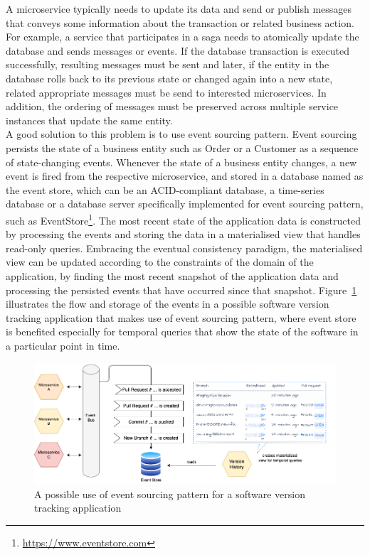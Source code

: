 \documentclass{Configuration_Files/PoliMi3i_thesis}
\begin{document}
A microservice typically needs to update its data and send or publish messages that conveys some information about the transaction or related business action.
For example, a service that participates in a saga needs to atomically update the database and sends messages or events.
If the database transaction is executed successfully, resulting messages must be sent and later, if the entity in the database rolls back to its previous state or changed again into a new state, related appropriate messages must be send to interested microservices.
In addition, the  ordering of messages must be preserved across multiple service instances that update the same entity.
\\
A good solution to this problem is to use event sourcing pattern.
Event sourcing persists the state of a business entity such as Order or a Customer as a sequence of state-changing events.
Whenever the state of a business entity changes, a new event is fired from the respective microservice, and stored in a database named as the event store, which can be an ACID-compliant database, a time-series database or a database server specifically implemented for event sourcing pattern, such as EventStore\footnote{\href{https://www.eventstore.com}{https://www.eventstore.com}}.
The most recent state of the application data is constructed by processing the events and storing the data in a materialised view that handles read-only queries.
Embracing the eventual consistency paradigm, the materialised view can be updated according to the constraints of the domain of the application, by finding the most recent snapshot of the application data and processing the persisted events that have occurred since that snapshot. Figure~\ref{fig:event_sourcing} illustrates the flow and storage of the events in a possible software version tracking application that makes use of event sourcing pattern, where event store is benefited especially for temporal queries that show the state of the software in a particular point in time.

\begin{figure}[H]
\centering
\includegraphics[width=1\textwidth]{myImages/event_store.png}
\caption{A possible use of event sourcing pattern for a software version tracking application}
\label{fig:event_sourcing}
\end{figure}
\end{document}
